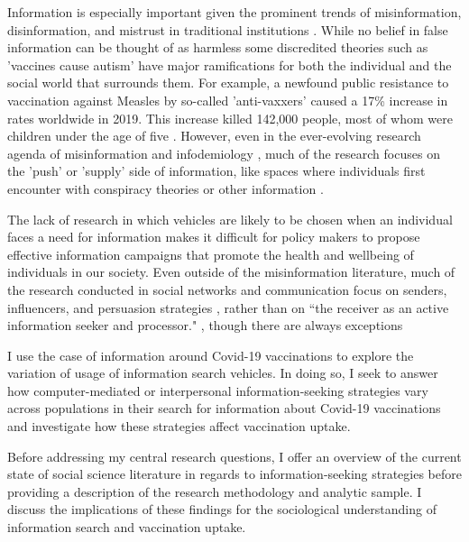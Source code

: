 Information is especially important given the prominent trends of
misinformation, disinformation, and mistrust in traditional institutions
\citep{starbird19, kata10}. While no belief in false information can be thought of as
harmless \citep{douglas21} some discredited theories such as 'vaccines cause autism'
have major ramifications for both the individual and the social world that
surrounds them. For example, a newfound public resistance to vaccination
against Measles by so-called 'anti-vaxxers' caused a 17\% increase in rates
worldwide in 2019. This increase killed  142,000 people, most of whom were
children under the age of five \citep{givetash19}. However, even in the ever-evolving
research agenda of misinformation and infodemiology \citep{eysenbach02}, much of the
research focuses on the 'push' or 'supply' side of information, like spaces where
individuals first encounter with conspiracy theories or other information
\citep{johnsonOnlineCompetitionPro2020, broniatowski_etal20}.

The lack of research in which vehicles are likely to be chosen when an
individual faces a need for information makes it difficult for policy makers to
propose effective information campaigns that promote the health and wellbeing of
individuals in our society. Even outside of the misinformation literature, much
of the research conducted in social networks and communication focus on senders,
influencers, and persuasion strategies 
\citep{mertonManifestLatentFunctions1968, katzPersonalInfluencePart1955, lazarsfeldPeopleChoice1944},
rather than on
“the receiver as an active information seeker and processor." \citep{johnsonComprehensiveModelCancerRelated1993},
though there are always exceptions \cite{ysenbach09}

I use the case of information around Covid-19 vaccinations to explore the
variation of usage of information search vehicles. In doing so, I seek to answer
how computer-mediated or interpersonal information-seeking strategies vary
across populations in their search for information about Covid-19 vaccinations
and investigate how these strategies affect vaccination uptake.

Before addressing my central research questions, I offer an overview of the
current state of social science literature in regards to information-seeking
strategies before providing a description of the research methodology and
analytic sample. I discuss the implications of these findings for the
sociological understanding of information search and vaccination uptake.

